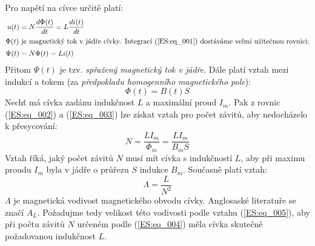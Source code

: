       Pro napětí na cívce určitě platí:
      \begin{align}
        u(t)    &= N\dfrac{d \Phi(t)}{d t} = L\dfrac{d i(t)}{d t}            \label{ES:eq_001}  \\
        \shortintertext{\(\Phi(t)\) je magnetický tok v jádře cívky. Integrací (\ref{ES:eq_001}) 
                       dostáváme velmi užitečnou rovnici:} 
        \Psi(t) &= N\Phi(t) = Li(t)                              \label{ES:eq_002}  
      \end{align}
      Přitom \(\Psi(t)\) je tzv. \emph{spřažený magnetický tok v jádře}. Dále platí vztah mezi 
      indukcí a tokem (za \emph{předpokladu homogenního magnetického pole}):
      \begin{equation}\label{ES:eq_003} 
        \Phi(t) = B(t)S
      \end{equation}
      Nechť má cívka zadánu indukčnost \(L\) a maximální proud \(I_m\). Pak z rovnic 
      (\ref{ES:eq_002}) a (\ref{ES:eq_003}) lze získat vztah pro počet závitů, aby nedocházelo k 
      přesycování:
      \begin{equation}\label{ES:eq_004}
        N = \frac{LI_m}{\Phi_m} = \frac{LI_m}{B_mS} 
      \end{equation}
      Vztah říká, jaký počet závitů \(N\) musí mít cívka s indukčností \(L\), aby při maximu proudu 
      \(I_m\) byla v jádře o průřezu \(S\) indukce \(B_m\). Současně platí vztah:
      \begin{equation}\label{ES:eq_005}
        \Lambda = \frac{L}{N^2} 
      \end{equation}
      \(\Lambda\) je magnetická vodivost magnetického obvodu cívky. Anglosaské literatuře se značí 
      \(A_L\). Požadujme tedy velikost této vodivosti podle vztahu (\ref{ES:eq_005}), aby při počtu 
      závitů \(N\) určeném podle (\ref{ES:eq_004}) měla cívka skutečně požadovanou indukčnost \(L\).
      
